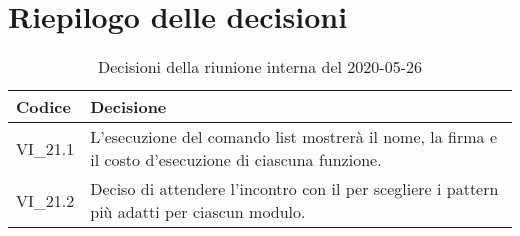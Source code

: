 \section{Riepilogo delle decisioni}
\begin{longtable}{ 
	 >{\centering}p{} >{}p{} }
	
	\caption{Decisioni della riunione interna del 2020-05-26}\\	
	
	\textbf{\color{white}Codice} & 
	\textbf{\color{white}Decisione} 
	\tabularnewline  
	\endhead
	
	VI\_21.1 & L'esecuzione del comando list mostrerà il nome, la firma e il costo d'esecuzione di ciascuna funzione. \\
	VI\_21.2 & Deciso di attendere l'incontro con il \RC{} per scegliere i pattern più adatti per ciascun modulo. \\
\end{longtable}
